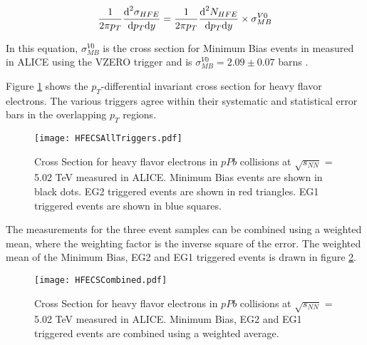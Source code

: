 \begin{equation}\label{eqn:cross section}
\frac{1}{2 \pi p_{T}} \frac{\textnormal{d}^{2} \sigma_{HFE}}{\textnormal{d}p_{T}\textnormal{d}y}  = \frac{1}{2 \pi p_{T}} \frac{\textnormal{d}^{2} N_{HFE}}{\textnormal{d}p_{T}\textnormal{d}y}  \times \sigma^{V0}_{MB}
\end{equation}

In this equation, $\sigma^{V0}_{MB}$ is the cross section for Minimum Bias events in measured in ALICE using the VZERO trigger and is $\sigma^{V0}_{MB} = 2.09 \pm 0.07$ barns \cite{Abelev:2014epa}.

Figure \ref{fig:HFECSAllTriggers} shows the $p_{T}$-differential invariant cross section for heavy flavor electrons. The various triggers agree within their systematic and statistical error bars in the overlapping $p_{T}$ regions.

\begin{figure}[h!]
  \centering
  \texttt{[image: HFECSAllTriggers.pdf]}\\
  \caption{Cross Section for heavy flavor electrons in $pPb$ collisions at $\sqrt{s_{NN}}$ = 5.02 TeV measured in ALICE. Minimum Bias events are shown in black dots. EG2 triggered events are shown in red triangles. EG1 triggered events are shown in blue squares.} \label{fig:HFECSAllTriggers}
\end{figure}

The measurements for the three event samples can be combined using a weighted mean, where the weighting factor is the inverse square of the error. The weighted mean of the Minimum Bias, EG2 and EG1 triggered events is drawn in figure \ref{fig:HFECSCombined}.

\begin{figure}[h!]
  \centering
  \texttt{[image: HFECSCombined.pdf]}\\
  \caption{Cross Section for heavy flavor electrons in $pPb$ collisions at $\sqrt{s_{NN}}$ = 5.02 TeV measured in ALICE. Minimum Bias, EG2 and EG1 triggered events are combined using a weighted average.} \label{fig:HFECSCombined}
\end{figure}



